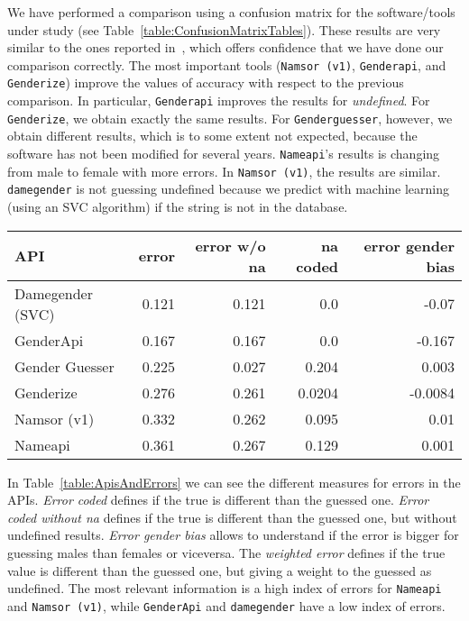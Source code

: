 \documentclass[a4paper]{article}
\begin{document}
We have performed a comparison using a confusion matrix for the software/tools under study (see Table~\ref{table:ConfusionMatrixTables}).
These results are very similar to the ones reported in~\cite{10.7717/peerj-cs.156}, which offers confidence that we have done our comparison correctly.
The most important tools (\texttt{Namsor (v1)}, \texttt{Genderapi}, and \texttt{Genderize}) improve the values of accuracy with respect to the previous comparison.
In particular, \texttt{Genderapi} improves the results for \emph{undefined}.
For \texttt{Genderize}, we obtain exactly the same results. 
For \texttt{Genderguesser}, however, we obtain different results, which is to some extent not expected, because the software has not been modified for several years.
\texttt{Nameapi}'s results is changing from male to female with more errors. 
In \texttt{Namsor (v1)}, the results are similar. 
\texttt{damegender} is not guessing undefined because we predict with machine learning (using an SVC algorithm) if the string is not in the database.

\begin{table*}
\footnotesize
\center
\begin{tabular}[]{lrrrr}
\hline
API & error & error w/o na & na coded & error gender bias\tabularnewline
\hline
Damegender (SVC)\footnotemark[1] & 0.121 & 0.121 & 0.0 & -0.07\tabularnewline
GenderApi & 0.167 & 0.167 & 0.0 & -0.167\tabularnewline
Gender Guesser & 0.225 & 0.027 & 0.204 & 0.003\tabularnewline
Genderize & 0.276 & 0.261 & 0.0204 & -0.0084 \tabularnewline 
Namsor (v1) & 0.332 & 0.262 & 0.095 & 0.01 \tabularnewline
Nameapi & 0.361 & 0.267 & 0.129 & 0.001 \tabularnewline
\hline
\end{tabular}
\caption{APIs and Errors}
\vspace{0.3cm}
\label{table:ApisAndErrors}
\end{table*}


In Table~\ref{table:ApisAndErrors} we can see the different measures
for errors in the APIs.  \emph{Error coded} defines if the true is
different than the guessed one.  \emph{Error coded without na} defines
if the true is different than the guessed one, but without undefined
results.  \emph{Error gender bias} allows to understand if the error
is bigger for guessing males than females or viceversa.  The
\emph{weighted error} defines if the true value is different than the
guessed one, but giving a weight to the guessed as undefined.  The
most relevant information is a high index of errors for
\texttt{Nameapi} and \texttt{Namsor (v1)}, while \texttt{GenderApi}
and \texttt{damegender} have a low index of errors.
\end{document}

